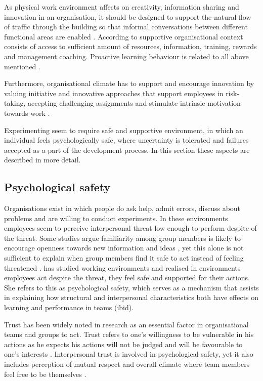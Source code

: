 As physical work environment affects on creativity, information sharing and innovation in an organisation, it should be designed to support the natural flow of traffic through the building so that informal conversations between different functional areas are enabled \citep{shalley2004leaders}. According to \citet{edmondson1996learning} supportive organisational context consists of access to sufficient amount of resources, information, training, rewards and management coaching. Proactive learning behaviour is related to all above mentioned \citep{edmondson2003speaking}. 

Furthermore, organisational climate has to support and encourage innovation \citep{mumford1988creativity,amabile1998kill} by valuing initiative and innovative approaches that support employees in risk-taking, accepting challenging assignments and stimulate intrinsic motivation towards work \citep{jung2003role}.

Experimenting seem to require safe and supportive environment, in which an individual feels psychologically safe, where uncertainty is tolerated and failures accepted as a part of the development process. In this section these aspects are described in more detail.  

\subsection{Psychological safety} \label{psychologicalsafety}
Organisations exist in which people do ask help, admit errors, discuss about problems and are willing to conduct experiments. In these environments employees seem to perceive interpersonal threat low enough to perform despite of the threat. Some studies argue familiarity among group members is likely to encourage openness towards new information and ideas \citep{sanna1990valence}, yet this alone is not sufficient to explain when group members find it safe to act instead of feeling threatened \citep{edmondson1999psychological}. \citet{edmondson1999psychological} has studied working environments and realised in environments employees act despite the threat, they feel safe and supported for their actions. She refers to this as psychological safety, which serves as a mechanism that assists in explaining how structural and interpersonal characteristics both have effects on learning and performance in teams (ibid).  

Trust has been widely noted in research as an essential factor in organisational teams and groups to act\citep{golembiewski1975centrality,kramer1999trust,shalley2004leaders,edmondson1999psychological}. Trust refers to one's willingness to be vulnerable in his actions as he expects his actions will not be judged and will be favourable to one's interests \citep{robinson1997corporate}. Interpersonal trust is involved in psychological safety, yet it also includes perception of mutual respect and overall climate where team members feel free to be themselves \citep{edmondson1999psychological}. 

